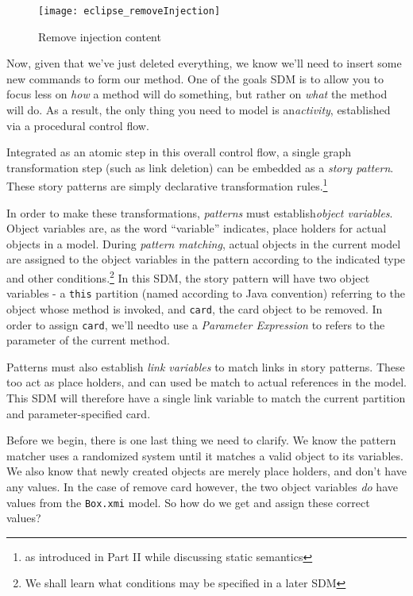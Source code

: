 \newpage

\begin{figure}[htbp]
	\centering
    \texttt{[image: eclipse\_removeInjection]}
	\caption{Remove injection content}
	\label{fig:delete_injection}
\end{figure}

\vspace{1cm}

Now, given that we've just deleted everything, we know we'll need to insert some new commands to form our method. One of the goals SDM is to allow you to
focus less on \emph{how} a method will do something, but rather on \emph{what} the method will do. As a result, the only thing you need to model is
an\emph{activity}, established via a procedural control flow. 

Integrated as an atomic step in this overall control flow, a single graph transformation step (such as link deletion) can be embedded as
a \emph{story pattern}. These story patterns are simply declarative transformation rules.\footnote{as introduced in Part II while
discussing static semantics}

In order to make these transformations, \emph{patterns} must establish\emph{object variables}. Object variables are, as
the word ``variable'' indicates, place holders for actual objects in a model.  During \emph{pattern matching}, actual objects in the 
current model are assigned to the object variables in the pattern according to the indicated type and other conditions.\footnote{We shall
learn what conditions may be specified in a later SDM} In this SDM, the story pattern will have two object variables - a \texttt{this} partition (named
according to Java convention) referring to the object whose method is invoked, and \texttt{card}, the card object to be removed. In order to assign
\texttt{card}, we'll needto use a \emph{Parameter Expression} to refers to the parameter of the current method.

Patterns must also establish \emph{link variables} to match links in story patterns. These too act as place holders, and
can used be match to actual references in the model. This SDM will therefore have a single link variable to match the current partition and parameter-specified
card.

Before we begin, there is one last thing we need to clarify. We know the pattern matcher uses a randomized system until it matches a valid object to its
variables. We also know that newly created objects are merely place holders, and don't have any values. In the case of remove card however, the two object
variables \emph{do} have values from the \texttt{Box.xmi} model. So how do we get and assign these correct values?

